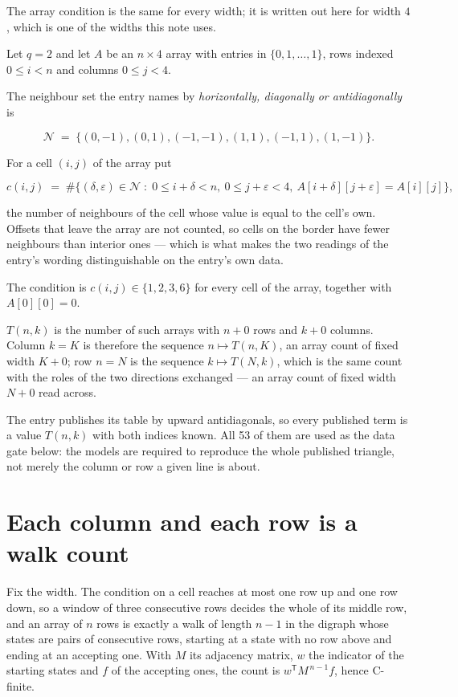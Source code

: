 \documentclass[11pt]{article}
\theoremstyle{definition}
\begin{document}
The array condition is the same for every width; it is written out here for width $4$, which is one of the widths this note uses.

Let $q = 2$ and let $A$ be an $n \times 4$ array with entries in $\{0,1,\dots,1\}$, rows indexed $0 \le i < n$ and columns $0 \le j < 4$.

The neighbour set the entry names by {\itshape horizontally, diagonally or antidiagonally} is

\[\mathcal{N} \;=\; \{(0,-1), (0,1), (-1,-1), (1,1), (-1,1), (1,-1)\}.\]

For a cell $(i,j)$ of the array put

\[c(i,j) \;=\; \#\bigl\{(\delta,\varepsilon)\in\mathcal{N} \;:\; 0\le i+\delta<n,\ 0\le j+\varepsilon<4,\ A[i+\delta][j+\varepsilon] = A[i][j]\bigr\},\]

the number of neighbours of the cell whose value is equal to the cell's own. Offsets that leave the array are not counted, so cells on the border have fewer neighbours than interior ones --- which is what makes the two readings of the entry's wording distinguishable on the entry's own data.

The condition is $c(i,j) \in \{1, 2, 3, 6\}$ for every cell of the array, together with $A[0][0]=0$.

$T(n,k)$ is the number of such arrays with $n + 0$ rows and $k + 0$ columns. Column $k = K$ is therefore the sequence $n \mapsto T(n,K)$, an array count of fixed width $K + 0$; row $n = N$ is the sequence $k \mapsto T(N,k)$, which is the same count with the roles of the two directions exchanged --- an array count of fixed width $N + 0$ read across.

The entry publishes its table by upward antidiagonals, so every published term is a value $T(n,k)$ with both indices known. All 53 of them are used as the data gate below: the models are required to reproduce the whole published triangle, not merely the column or row a given line is about.

\section{Each column and each row is a walk count}

Fix the width. The condition on a cell reaches at most one row up and one row down, so a window of three consecutive rows decides the whole of its middle row, and an array of $n$ rows is exactly a walk of length $n-1$ in the digraph whose states are pairs of consecutive rows, starting at a state with no row above and ending at an accepting one. With $M$ its adjacency matrix, $w$ the indicator of the starting states and $f$ of the accepting ones, the count is $w^{\mathsf T}M^{\,n-1}f$, hence C-finite.
\end{document}
